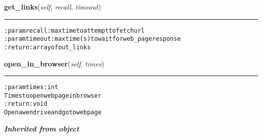     \label{hal:internet:web:Webpage:get_links}

    \vspace{0.5ex}

\hspace{.8\funcindent}\begin{boxedminipage}{\funcwidth}

    \raggedright \textbf{get\_links}(\textit{self}, \textit{recall}, \textit{timeout})

    \vspace{-1.5ex}

    \rule{\textwidth}{0.5\fboxrule}
\setlength{\parskip}{2ex}
\begin{alltt}

:param recall: max time to attempt to fetch url
:param timeout: max time (s) to wait for web\_page response
:return: array of out\_links
\end{alltt}

\setlength{\parskip}{1ex}
    \end{boxedminipage}

    \label{hal:internet:web:Webpage:open_in_browser}

    \vspace{0.5ex}

\hspace{.8\funcindent}\begin{boxedminipage}{\funcwidth}

    \raggedright \textbf{open\_in\_browser}(\textit{self}, \textit{times})

    \vspace{-1.5ex}

    \rule{\textwidth}{0.5\fboxrule}
\setlength{\parskip}{2ex}
\begin{alltt}

:param times: int
    Times to open webpage in browser
:return: void
    Open a wendrive and go to webpage
\end{alltt}

\setlength{\parskip}{1ex}
    \end{boxedminipage}


\large{\textbf{\textit{Inherited from object}}}


